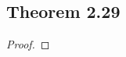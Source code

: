 \documentclass[../../main.tex]{subfiles}
\begin{document}
\subsection{Theorem 2.29}
\begin{wts}

\end{wts}
\begin{proof}

\end{proof}
\end{document}
